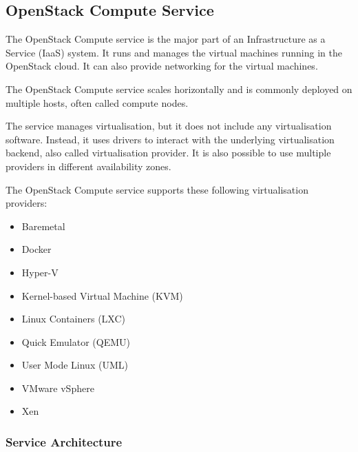 \subsection{OpenStack Compute Service}
The OpenStack Compute service is the major part of an Infrastructure as a Service (IaaS) system. It runs and manages the virtual machines running in the OpenStack cloud. It can also provide networking for the virtual machines. \cite{InstallGuide}

The OpenStack Compute service scales horizontally and is commonly deployed on multiple hosts, \cite{OperationsGuide} often called compute nodes.

The service manages virtualisation, but it does not include any virtualisation software. Instead, it uses drivers to interact with the underlying virtualisation backend, also called virtualisation provider. It is also possible to use multiple providers in different availability zones.

The OpenStack Compute service supports these following virtualisation providers: \cite{AdminGuide}
\begin{itemize}
  \item{Baremetal}
  \item{Docker}
  \item{Hyper-V}
  \item{Kernel-based Virtual Machine (KVM)}
  \item{Linux Containers (LXC)}
  \item{Quick Emulator (QEMU)}
  \item{User Mode Linux (UML)}
  \item{VMware vSphere}
  \item{Xen}
\end{itemize}

\subsubsection*{Service Architecture}

